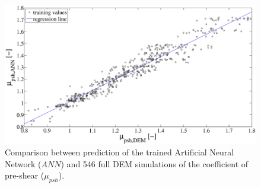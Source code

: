 \begin{figure}%
\centering 
\includegraphics[width=.96\columnwidth]{images/22regression.eps}
\caption[Comparison between prediction of the trained ANN and full DEM
simulation]{Comparison between prediction of the trained Artificial Neural
Network ($ANN$) and 546 
full DEM simulations of the coefficient of pre-shear
($\mu_{psh}$).}
\label{fig:22regression} 
\end{figure}